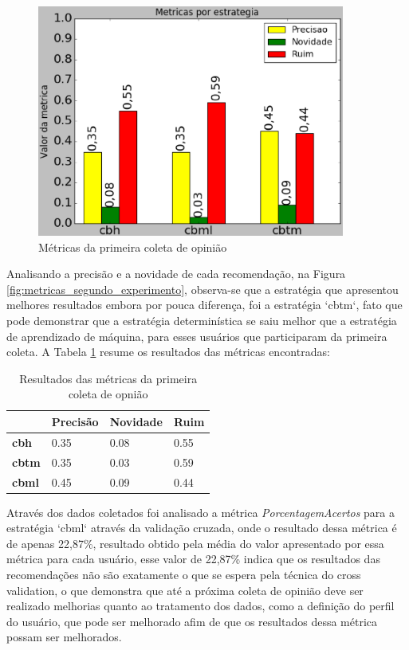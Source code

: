\pagebreak

\begin{figure}[h]
  \centering
  \includegraphics[width=0.9\textwidth]{figuras/metricas_primeiro_experimento.eps}
  \caption{Métricas da primeira coleta de opinião}
  \label{fig:metricas_primeiro_experimento}
\end{figure}

Analisando a precisão e a novidade de cada recomendação, na Figura
\ref{fig:metricas_segundo_experimento}, observa-se que a estratégia que
apresentou melhores resultados embora por pouca diferença, foi a estratégia
`cbtm`, fato que pode demonstrar que a estratégia determinística se saiu melhor
que a estratégia de aprendizado de máquina, para esses usuários que
participaram da primeira coleta. A Tabela \ref{tab:resultado_p1} resume os
resultados das métricas encontradas:

\begin{table}[]
    \centering
    \label{tab:resultado_p1}
    \begin{tabular}{|l|l|l|l|}
    \hline
    & \textbf{Precisão} & \textbf{Novidade} & \textbf{Ruim} \\ \hline
    \textbf{cbh}  & 0.35     & 0.08     & 0.55 \\ \hline
    \textbf{cbtm} & 0.35     & 0.03     & 0.59 \\ \hline
    \textbf{cbml} & 0.45     & 0.09     & 0.44 \\ \hline
    \end{tabular}
    \caption{Resultados das métricas da primeira coleta de opnião}
\end{table}

Através dos dados coletados foi analisado a métrica \textit{PorcentagemAcertos}
para a estratégia `cbml` através da validação cruzada, onde o resultado dessa
métrica é de apenas 22,87\%, resultado obtido pela média do valor apresentado
por essa métrica para cada usuário, esse valor de 22,87\% indica que os
resultados das recomendações não são exatamente o que se espera pela técnica
do cross validation, o que demonstra que até a próxima coleta de opinião deve ser
realizado melhorias quanto ao tratamento dos dados, como a definição do perfil
do usuário, que pode ser melhorado afim de que os resultados dessa métrica
possam ser melhorados.

